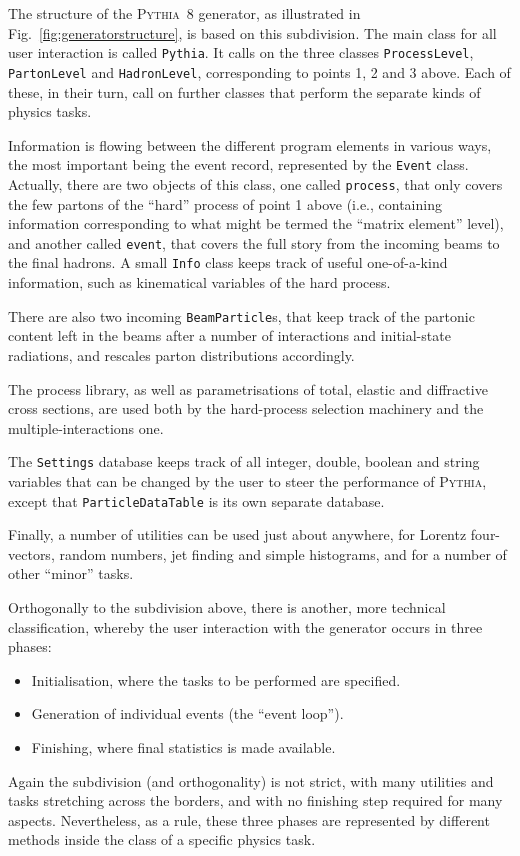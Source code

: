 \documentclass{elsartmod}
\begin{document}
The structure of the \textsc{Pythia}~8 generator, as illustrated in 
Fig.~\ref{fig:generatorstructure}, is based on this subdivision.
The main class for all user interaction is called \texttt{Pythia}. 
It calls on the three classes \texttt{ProcessLevel},
\texttt{PartonLevel} and \texttt{HadronLevel}, corresponding 
to points 1, 2 and 3 above. Each of these, in their turn, call on 
further classes that perform the separate kinds of physics tasks.

Information is flowing between the different program elements in
various ways, the most important being the event record, represented
by the \texttt{Event} class. Actually, there are two objects of this
class, one called \texttt{process}, that only covers the few partons
of the ``hard'' process of point 1 above (i.e., containing information
corresponding to what might be termed the ``matrix element'' level),
and another called \texttt{event}, that covers the full story from the
incoming beams to the final hadrons. A small \texttt{Info} class keeps
track of useful one-of-a-kind information, such as kinematical
variables of the hard process.

There are also two incoming \texttt{BeamParticle}s, that keep track
of the partonic content left in the beams after a number of 
interactions and initial-state radiations, and rescales parton
distributions accordingly. 

The process library, as well as parametrisations of total, elastic 
and diffractive cross sections, are used both by the hard-process
selection machinery and the multiple-interactions one. 

The \texttt{Settings} database keeps track of all integer, double,
boolean and string variables that can be changed by the user to steer
the performance of \textsc{Pythia}, except that 
\texttt{ParticleDataTable} is its own separate database.

Finally, a number of utilities can be used just about anywhere,
for Lorentz four-vectors, random numbers, jet finding and simple 
histograms, and for a number of other ``minor'' tasks.

Orthogonally to the subdivision above, there is another, more 
technical classification, whereby the user interaction with the
generator occurs in three phases:
\begin{itemize}
\item Initialisation, where the tasks to be performed are specified.
\item Generation of individual events (the ``event loop'').
\item Finishing, where final statistics is made available.
\end{itemize}
Again the subdivision (and orthogonality) is not strict, with many 
utilities and tasks stretching across the borders, and with no 
finishing step required for many aspects. Nevertheless, as a rule, 
these three phases are represented by different methods  
inside the class of a specific physics task.
\end{document}
